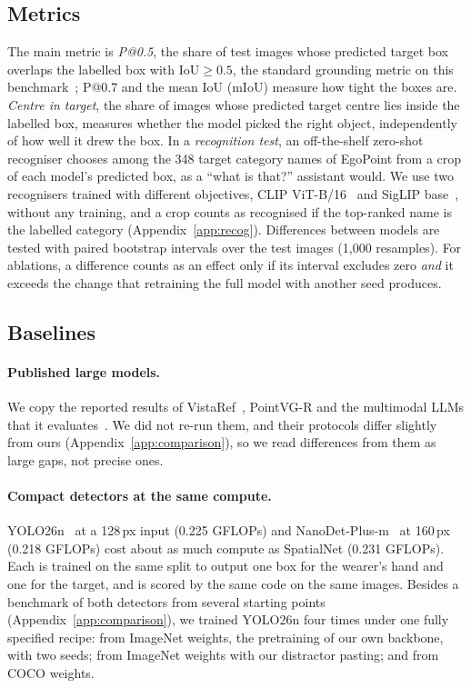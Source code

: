 \subsection{Metrics}\label{sec:metrics}
The main metric is \emph{P@0.5}, the share of test images whose predicted target box overlaps the labelled box with IoU${\geq}0.5$, the standard grounding metric on this benchmark~\cite{egopoint,li2026vistaref,li2026pointvgr}; P@0.7 and the mean IoU (mIoU) measure how tight the boxes are. \emph{Centre in target}, the share of images whose predicted target centre lies inside the labelled box, measures whether the model picked the right object, independently of how well it drew the box. In a \emph{recognition test}, an off-the-shelf zero-shot recogniser chooses among the 348 target category names of EgoPoint from a crop of each model's predicted box, as a ``what is that?'' assistant would. We use two recognisers trained with different objectives, CLIP ViT-B/16~\cite{radford2021clip} and SigLIP base~\cite{zhai2023siglip}, without any training, and a crop counts as recognised if the top-ranked name is the labelled category (Appendix~\ref{app:recog}). Differences between models are tested with paired bootstrap intervals over the test images (1,000 resamples). For ablations, a difference counts as an effect only if its interval excludes zero \emph{and} it exceeds the change that retraining the full model with another seed produces.

\subsection{Baselines}\label{sec:baselines}
\paragraph{Published large models.} We copy the reported results of VistaRef~\cite{li2026vistaref}, PointVG-R and the multimodal LLMs that it evaluates~\cite{li2026pointvgr}. We did not re-run them, and their protocols differ slightly from ours (Appendix~\ref{app:comparison}), so we read differences from them as large gaps, not precise ones.

\paragraph{Compact detectors at the same compute.} YOLO26n~\cite{ultralytics2026yolo26} at a 128\,px input (0.225 GFLOPs) and NanoDet-Plus-m~\cite{rangilyu2021nanodet} at 160\,px (0.218 GFLOPs) cost about as much compute as SpatialNet (0.231 GFLOPs). Each is trained on the same split to output one box for the wearer's hand and one for the target, and is scored by the same code on the same images. Besides a benchmark of both detectors from several starting points (Appendix~\ref{app:comparison}), we trained YOLO26n four times under one fully specified recipe: from ImageNet weights, the pretraining of our own backbone, with two seeds; from ImageNet weights with our distractor pasting; and from COCO weights.

